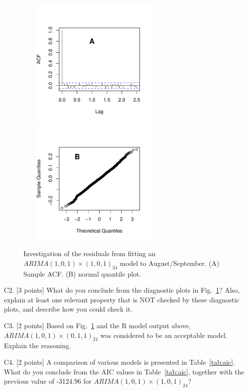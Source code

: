\documentclass[12pt]{article}
\def\qskip{\vspace{1.5in}}
\begin{document}
\begin{figure}[ht]
\includegraphics[width=3in,height=2.5in]{ER-resid-acf}
\includegraphics[width=3in,height=2.5in]{ER-qqnorm}
\vspace{-0.5cm}
\caption{ Investigation of the residuals from fitting an $ARIMA(1,0,1){\times}(1,0,1)_{24}$ model to August/September. (A) Sample ACF. (B) normal quantile plot.}\label{fig:diag}
\end{figure}
C2. [3 points] What do you conclude from the diagnostic plots in Fig.~\ref{fig:diag}? Also, explain at least one relevant property that is NOT checked by these diagnostic plots, and describe how you could check it.

\qskip

\newpage

C3. [2 points] Based on  Fig.~\ref{fig:diag} and the R model output above,  $ARIMA(1,0,1){\times}(0,1,1)_{24}$ was considered to be an acceptable model. Explain the reasoning.

\qskip
\vspace{1cm}

C4. [2 points] A comparison of various models is presented in Table~\ref{tab:aic}. What do you conclude from the AIC values in Table~\ref{tab:aic}, together with the previous value of -3124.96 for $ARIMA(1,0,1){\times}(1,0,1)_{24}$?
\end{document}
